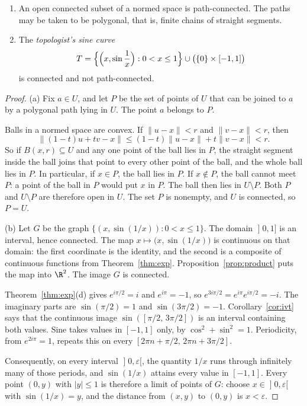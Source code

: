 \begin{proposition}\label{prop:openconnected}
\begin{enumerate}[label=(\alph*)]
\item An open connected subset of a normed space is path-connected. The paths may be taken to be polygonal, that is, finite chains of straight segments.
\item The \emph{topologist's sine curve}
\[
T=\Bigl\{\Bigl(x,\sin\frac1x\Bigr):0<x\le1\Bigr\}\cup\bigl(\{0\}\times[-1,1]\bigr)
\]
is connected and not path-connected.
\end{enumerate}
\end{proposition}
\begin{proof}
(a) Fix $a\in U$, and let $P$ be the set of points of $U$ that can be joined to $a$ by a polygonal path lying in $U$. The point $a$ belongs to $P$.

Balls in a normed space are convex. If $\|u-x\|<r$ and $\|v-x\|<r$, then
\[
\|(1-t)u+tv-x\|\le(1-t)\|u-x\|+t\|v-x\|<r.
\]
So if $B(x,r)\subseteq U$ and any one point of the ball lies in $P$, the straight segment inside the ball joins that point to every other point of the ball, and the whole ball lies in $P$. In particular, if $x\in P$, the ball lies in $P$. If $x\notin P$, the ball cannot meet $P$: a point of the ball in $P$ would put $x$ in $P$. The ball then lies in $U\setminus P$. Both $P$ and $U\setminus P$ are therefore open in $U$. The set $P$ is nonempty, and $U$ is connected, so $P=U$.

(b) Let $G$ be the graph $\{(x,\sin(1/x)):0<x\le1\}$. The domain $\mathopen]0,1]$ is an interval, hence connected. The map $x\mapsto\bigl(x,\sin(1/x)\bigr)$ is continuous on that domain: the first coordinate is the identity, and the second is a composite of continuous functions from Theorem~\ref{thm:exp}. Proposition~\ref{prop:product} puts the map into $\R^2$. The image $G$ is connected.

Theorem~\ref{thm:exp}(d) gives $e^{i\pi/2}=i$ and $e^{i\pi}=-1$, so $e^{3i\pi/2}=e^{i\pi}e^{i\pi/2}=-i$. The imaginary parts are $\sin(\pi/2)=1$ and $\sin(3\pi/2)=-1$. Corollary~\ref{cor:ivt} says that the continuous image $\sin([\pi/2,\,3\pi/2])$ is an interval containing both values. Sine takes values in $[-1,1]$ only, by $\cos^2+\sin^2=1$. Periodicity, from $e^{2i\pi}=1$, repeats this on every $[2\pi n+\pi/2,\, 2\pi n+3\pi/2]$.

Consequently, on every interval $\mathopen]0,\varepsilon[$, the quantity $1/x$ runs through infinitely many of those periods, and $\sin(1/x)$ attains every value in $[-1,1]$. Every point $(0,y)$ with $|y|\le1$ is therefore a limit of points of $G$: choose $x\in\mathopen]0,\varepsilon[$ with $\sin(1/x)=y$, and the distance from $(x,y)$ to $(0,y)$ is $x<\varepsilon$.


\end{proof}
